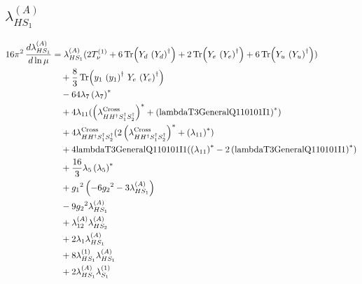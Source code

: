 \documentclass[10pt,a4paper]{article}
\begin{document}
\subsection*{$\lambda_{HS_1}^{(A)}$}
\begin{align*}
16\pi^2\,\frac{d \lambda_{HS_1}^{(A)}}{d\ln\mu} &={\lambda_{HS_1}^{(A)}} (2 T_{\nu}^{(1)}+6 \operatorname{Tr}\!\left({Y_d}\,\left({Y_d}\right)^{\dagger}\right)+2 \operatorname{Tr}\!\left({Y_e}\,\left({Y_e}\right)^{\dagger}\right)+6 \operatorname{Tr}\!\left({Y_u}\,\left({Y_u}\right)^{\dagger}\right)) \\
&\quad +\frac{8}{3} \operatorname{Tr}\!\left({y_1}\,\left({y_1}\right)^{\dagger}\,{Y_e}\,\left({Y_e}\right)^{\dagger}\right) \\
&\quad -64 {\lambda_{7}} \left({\lambda_{7}}\right)^{*} \\
&\quad +4 {\lambda_{11}} (\left({\lambda_{H H^\dagger S_1^\dagger S_2^\dagger}^{\rm Cross}}\right)^{*}+\left(\text{lambdaT3GeneralQ110101I1}\right)^{*}) \\
&\quad +4 {\lambda_{H H^\dagger S_1^\dagger S_2^\dagger}^{\rm Cross}} (2 \left({\lambda_{H H^\dagger S_1^\dagger S_2^\dagger}^{\rm Cross}}\right)^{*}+\left({\lambda_{11}}\right)^{*}) \\
&\quad +4 \text{lambdaT3GeneralQ110101I1} (\left({\lambda_{11}}\right)^{*}-2 \left(\text{lambdaT3GeneralQ110101I1}\right)^{*}) \\
&\quad +\frac{16}{3} {\lambda_5} \left({\lambda_5}\right)^{*} \\
&\quad +{g_1}^2 \left(-6 {g_2}^2-3 {\lambda_{HS_1}^{(A)}}\right) \\
&\quad -9 {g_2}^2 {\lambda_{HS_1}^{(A)}} \\
&\quad +{\lambda_{12}^{(A)}} {\lambda_{HS_2}^{(A)}} \\
&\quad +2 {\lambda_1} {\lambda_{HS_1}^{(A)}} \\
&\quad +8 {\lambda_{HS_1}^{(1)}} {\lambda_{HS_1}^{(A)}} \\
&\quad +2 {\lambda_{HS_1}^{(A)}} {\lambda_{S_1}^{(1)}} \\
\end{align*}
\end{document}
